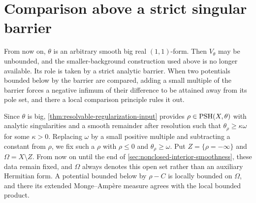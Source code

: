 \section{Comparison above a strict singular barrier}
\label{sec:big-minimal-comparison}

From now on, $\theta$ is an arbitrary smooth big real $(1,1)$-form. Then $V_\theta$ may be unbounded, and the smaller-background construction used above is no longer available. Its role is taken by a strict analytic barrier. When two potentials bounded below by the barrier are compared, adding a small multiple of the barrier forces a negative infimum of their difference to be attained away from its pole set, and there a local comparison principle rules it out.

Since $\theta$ is big, \cref{thm:resolvable-regularization-input} provides $\rho\in\mathrm{PSH}(X,\theta)$ with analytic singularities and a smooth remainder after resolution such that $\theta_\rho\geq\kappa\omega$ for some $\kappa>0$. Replacing $\omega$ by a small positive multiple and subtracting a constant from $\rho$, we fix such a $\rho$ with $\rho\leq0$ and $\theta_\rho\geq\omega$. Put $Z=\{\rho=-\infty\}$ and $\Omega=X\setminus Z$. From now on until the end of \cref{sec:nonclosed-interior-smoothness}, these data remain fixed, and $\Omega$ always denotes this open set rather than an auxiliary Hermitian form. A potential bounded below by $\rho-C$ is locally bounded on $\Omega$, and there its extended Monge--Amp\`ere measure agrees with the local bounded product.


